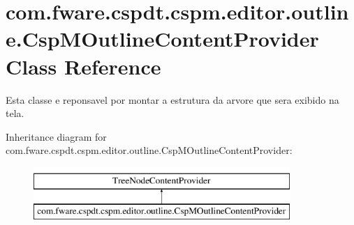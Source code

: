 \hypertarget{classcom_1_1fware_1_1cspdt_1_1cspm_1_1editor_1_1outline_1_1_csp_m_outline_content_provider}{}\section{com.\+fware.\+cspdt.\+cspm.\+editor.\+outline.\+Csp\+M\+Outline\+Content\+Provider Class Reference}
\label{classcom_1_1fware_1_1cspdt_1_1cspm_1_1editor_1_1outline_1_1_csp_m_outline_content_provider}


Esta classe e reponsavel por montar a estrutura da arvore que sera exibido na tela.  


Inheritance diagram for com.\+fware.\+cspdt.\+cspm.\+editor.\+outline.\+Csp\+M\+Outline\+Content\+Provider\+:\begin{figure}[H]
\begin{center}
\leavevmode
\includegraphics[height=2.000000cm]{classcom_1_1fware_1_1cspdt_1_1cspm_1_1editor_1_1outline_1_1_csp_m_outline_content_provider}
\end{center}
\end{figure}
